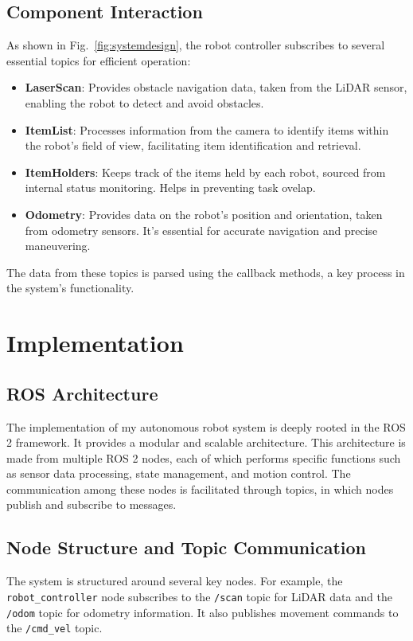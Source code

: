 \documentclass[conference]{IEEEtran}
\begin{document}
\subsection{Component Interaction}
As shown in Fig.~\ref{fig:systemdesign}, the robot controller subscribes to several essential topics for efficient operation:

\begin{itemize}
    \item \textbf{LaserScan}: Provides obstacle navigation data, taken from the LiDAR sensor, enabling the robot to detect and avoid obstacles.
    \item \textbf{ItemList}: Processes information from the camera to identify items within the robot's field of view, facilitating item identification and retrieval.
    \item \textbf{ItemHolders}: Keeps track of the items held by each robot, sourced from internal status monitoring. Helps in preventing task ovelap.
    \item \textbf{Odometry}: Provides data on the robot's position and orientation, taken from odometry sensors. It's essential for accurate navigation and precise maneuvering.
\end{itemize}

The data from these topics is parsed using the callback methods, a key process in the system's functionality.



\section{Implementation}
\subsection{ROS Architecture}
The implementation of my autonomous robot system is deeply rooted in the ROS 2 framework. It provides a modular and scalable architecture. This architecture is made from multiple ROS 2 nodes, each of which performs specific functions such as sensor data processing, state management, and motion control. The communication among these nodes is facilitated through topics, in which nodes publish and subscribe to messages.

\subsection{Node Structure and Topic Communication}
The system is structured around several key nodes. For example, the \texttt{robot\_controller} node subscribes to the \texttt{/scan} topic for LiDAR data and the \texttt{/odom} topic for odometry information. It also publishes movement commands to the \texttt{/cmd\_vel} topic.
\end{document}
